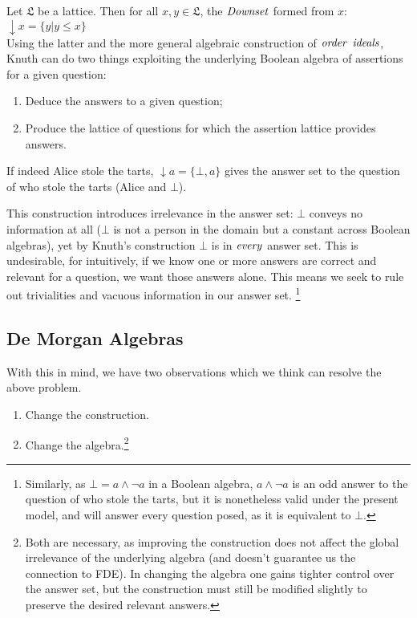 \documentclass[11pt,a4paper]{article}
\theoremstyle{definition}
\begin{document}
 Let $\mathfrak{L}$ be a lattice. Then for all $x,y \in \mathfrak{L}$, the $\it{Downset}$ formed from $x$: $\downarrow x = \{y | y \le x\}$ \\
Using the latter and the more general algebraic construction of $\it{order}$ $\it{ideals}$, Knuth can do two things exploiting the underlying Boolean algebra of assertions for a given question:
\begin{enumerate}
    \item Deduce the answers to a given question;
    \item Produce the lattice of questions for which the assertion lattice provides answers.
\end{enumerate}
\example \label{sec-example}If indeed Alice stole the tarts, $\downarrow$$a = \{\bot, a\}$ gives the answer set to the question of who stole the tarts (Alice and $\bot$).\\ 
\par This construction introduces irrelevance in the answer set: $\bot$ conveys no information at all ($\bot$ is not a person in the domain but a constant across Boolean algebras), yet by Knuth's construction $\bot$ is in $\it{every}$ answer set. This is undesirable, for intuitively, if we know one or more answers are correct and relevant for a question, we want those answers alone. This means we seek to rule out trivialities and vacuous information in our answer set. \footnote{Similarly, as $\bot = a \land \neg a$ in a Boolean algebra, $a \land \neg a$ is an odd answer to the question of who stole the tarts, but it is nonetheless valid under the present model, and will answer every question posed, as it is equivalent to $\bot$.} %


\subsection{De Morgan Algebras}
With this in mind, we have two observations which we think can resolve the above problem. 
\begin{enumerate}
    \item Change the construction.
    \item Change the algebra.\footnote{Both are necessary, as improving the construction does not affect the global irrelevance of the underlying algebra (and doesn't guarantee us the connection to FDE). In changing the algebra one gains tighter control over the answer set, but the construction must still be modified slightly to preserve the desired relevant answers.}
\end{enumerate}
\end{document}
